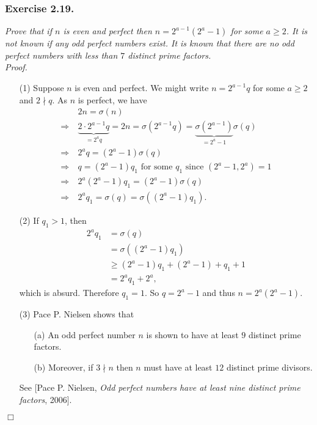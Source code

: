 \documentclass{article}
\begin{document}



\subsubsection*{Exercise 2.19.}
\emph{Prove that if $n$ is even and perfect then $n = 2^{a-1}(2^a-1)$ for some $a \geq 2$.
It is not known if any odd perfect numbers exist.
It is known that there are no odd perfect numbers with less than $7$ distinct prime factors.} \\



\emph{Proof.}
\begin{enumerate}
\item[(1)]
  Suppose $n$ is even and perfect.
  We might write $n = 2^{a-1}q$ for some $a \geq 2$ and $2 \nmid q$.
  As $n$ is perfect, we have
  \begin{align*}
    &\:
    2n = \sigma(n) \\
    \Longrightarrow &\:
    \underbrace{2 \cdot 2^{a-1}q}_{= 2^a q}
    = 2n
    = \sigma(2^{a-1}q)
    = \underbrace{\sigma(2^{a-1})}_{= 2^{a}-1} \sigma(q) \\
    \Longrightarrow &\:
    2^{a}q = (2^{a} - 1) \sigma(q) \\
    \Longrightarrow &\:
    \text{$q = (2^a - 1) q_1$ for some $q_1$ since $(2^a-1, 2^a) = 1$} \\
    \Longrightarrow &\:
    2^{a} (2^a - 1) q_1 = (2^{a} - 1) \sigma(q) \\
    \Longrightarrow &\:
    2^{a} q_1 = \sigma(q) = \sigma((2^a - 1) q_1).
  \end{align*}

\item[(2)]
  If $q_1 > 1$, then
  \begin{align*}
    2^{a} q_1
    &= \sigma(q) \\
    &= \sigma((2^a - 1) q_1) \\
    &\geq (2^a - 1) q_1 + (2^a - 1) + q_1 + 1 \\
    &= 2^{a} q_1 + 2^a,
  \end{align*}
  which is absurd.
  Therefore $q_1 = 1$. So $q = 2^a - 1$ and thus $n = 2^a(2^a-1)$.

\item[(3)]
  Pace P. Nielsen shows that
  \begin{enumerate}
  \item[(a)]
    An odd perfect number $n$ is shown to have at least $9$ distinct prime factors.

  \item[(b)]
    Moreover, if $3 \nmid n$ then $n$ must have at least $12$ distinct prime divisors.
  \end{enumerate}
  See [Pace P. Nielsen, \emph{Odd perfect numbers have at least nine distinct prime factors}, 2006].
\end{enumerate}
$\Box$ \\\\
\end{document}
